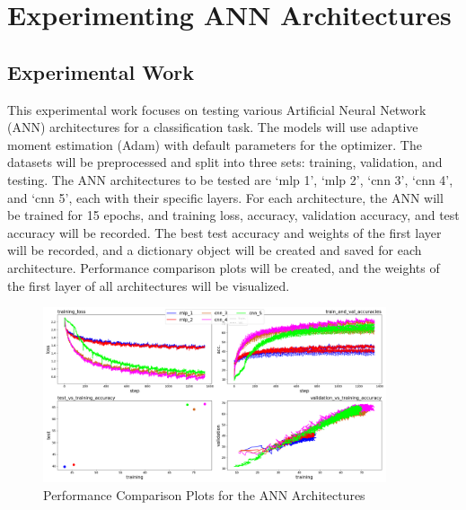 \documentclass[3p,times,procedia]{elsarticle}
\begin{document}
\section{\textbf{Experimenting ANN Architectures}}

\subsection{\textbf{Experimental Work}}

This experimental work focuses on testing various Artificial Neural Network (ANN) architectures for a classification task. The models will use adaptive moment estimation (Adam) with default parameters for the optimizer. The datasets will be preprocessed and split into three sets: training, validation, and testing. The ANN architectures to be tested are ‘mlp 1’, ‘mlp 2’, ‘cnn 3’, ‘cnn 4’, and ‘cnn 5’, each with their specific layers.
For each architecture, the ANN will be trained for 15 epochs, and training loss, accuracy, validation accuracy, and test accuracy will be recorded. The best test accuracy and weights of the first layer will be recorded, and a dictionary object will be created and saved for each architecture.
Performance comparison plots will be created, and the weights of the first layer of all architectures will be visualized.

\begin{figure}[H]
    \centering
    \includegraphics[width=0.9\textwidth, trim={0 0cm 0 0cm}]{figures/aa.png}
    \caption{Performance Comparison Plots for the ANN Architectures} 
    \label{fig:perf}
\end{figure}
\end{document}
